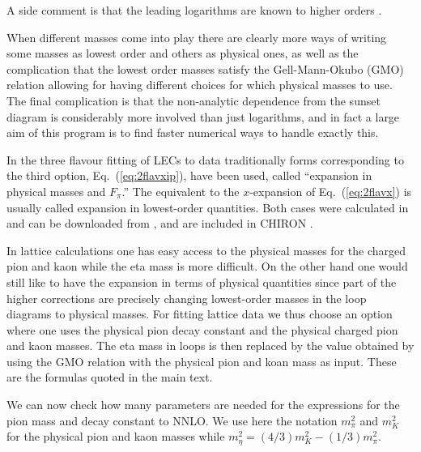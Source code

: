 \documentclass[12pt,a4paper]{article}
\begin{document}
A side comment is that the leading logarithms are known to higher orders \cite{Bijnens:2010xg,Bijnens:2009zi,Bijnens:2013yca}.

When different masses come into play there are clearly more ways of writing some masses as lowest order and others as physical ones, as well as the complication that the lowest order masses satisfy the Gell-Mann-Okubo (GMO) relation
allowing for having different choices for which physical masses to use. The final complication is that the non-analytic dependence from the sunset diagram is considerably more involved than just logarithms, and in fact a large aim of this program is to find faster numerical ways to handle exactly this.

In the three flavour fitting of LECs to data \cite{Amoros:2001cp,Bijnens:2011tb,Bijnens:2014lea} traditionally forms
corresponding to the third option, Eq.~(\ref{eq:2flavxip}), have been used, called ``expansion in physical masses and $F_\pi$.'' The equivalent to the $x$-expansion of Eq.~(\ref{eq:2flavx}) is usually called expansion in lowest-order quantities. Both cases were calculated in \cite{Amoros:1999dp} and can be downloaded from \cite{chpthomepage}, and are included in \textsc{CHIRON} \cite{Bijnens:2014gsa}.

In lattice calculations one has easy access to the physical masses for the charged pion and kaon while the eta mass is more difficult. On the other hand one would still like to have the expansion in terms of physical quantities since part of the higher corrections are precisely changing lowest-order masses in the loop diagrams to physical masses. For fitting lattice data we thus choose an option where one uses the physical pion decay constant and the physical charged pion and kaon masses. The eta mass in loops is then replaced by the value obtained by using the GMO relation with the physical pion and koan mass as input. These are the formulas quoted in the main text.

We can now check how many parameters are needed for the expressions for the pion mass and decay constant to NNLO. We use here the notation $m_\pi^2$ and $m_K^2$ for the physical pion and kaon masses while $m_\eta^2 = (4/3)m_K^2-(1/3)m_\pi^2$.
\end{document}

